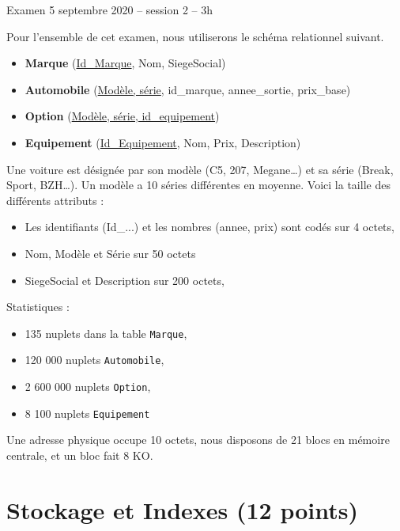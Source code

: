 %
{Examen 5 septembre 2020 -- session 2 -- 3h}%
{\empty}%

Pour l'ensemble de cet examen, nous utiliserons le schéma relationnel suivant.

\begin{itemize}
 \item \textbf{Marque} (\underline{Id\_Marque}, Nom, SiegeSocial)\\
 \item \textbf{Automobile} (\underline{Modèle, série}, id\_marque, annee\_sortie, prix\_base)\\
 \item \textbf{Option} (\underline{Modèle, série, id\_equipement})\\
 \item \textbf{Equipement} (\underline{Id\_Equipement}, Nom, Prix, Description)\\
\end{itemize}

Une voiture est désignée par son modèle (C5, 207, Megane\ldots) et sa série (Break, Sport, BZH\ldots).
Un modèle a 10 séries différentes en moyenne. Voici la taille des différents attributs :
\begin{itemize}
    \item Les identifiants (Id\_...) et les nombres (annee, prix) sont codés sur 4 octets,
    \item Nom, Modèle et Série sur 50 octets
    \item SiegeSocial et Description sur 200 octets,
\end{itemize}

Statistiques :
\begin{itemize}
    \item 135 nuplets dans la table {\tt Marque},
    \item 120 000 nuplets {\tt Automobile},
    \item 2 600 000 nuplets {\tt Option},
    \item 8 100 nuplets {\tt Equipement}
\end{itemize}

Une adresse physique occupe 10 octets, nous disposons de 21 blocs en 
mémoire centrale, et un bloc fait 8 KO.

\section{Stockage et Indexes (12 points)}


